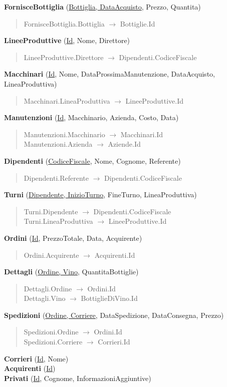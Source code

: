 \textbf{FornisceBottiglia} (\underline{Bottiglia, DataAcquisto}, Prezzo, Quantita)
\begin{verse}
	FornisceBottiglia.Bottiglia $\to$ Bottiglie.Id
\end{verse} 
\textbf{LineeProduttive} (\underline{Id}, Nome, Direttore)
\begin{verse}
	LineeProduttive.Direttore $\to$ Dipendenti.CodiceFiscale
\end{verse} 
\textbf{Macchinari} (\underline{Id}, Nome, DataProssimaManutenzione, DataAcquisto, LineaProduttiva)
\begin{verse}
	Macchinari.LineaProduttiva $\to$ LineeProduttive.Id
\end{verse} 
\textbf{Manutenzioni} (\underline{Id}, Macchinario, Azienda, Costo, Data)
\begin{verse}
	Manutenzioni.Macchinario $\to$ Macchinari.Id\\
	Manutenzioni.Azienda $\to$ Aziende.Id
\end{verse}
\textbf{Dipendenti} (\underline{CodiceFiscale}, Nome, Cognome, Referente)
\begin{verse}
	Dipendenti.Referente $\to$ Dipendenti.CodiceFiscale
\end{verse} 
\textbf{Turni} (\underline{Dipendente, InizioTurno}, FineTurno, LineaProduttiva)
\begin{verse}
	Turni.Dipendente $\to$ Dipendenti.CodiceFiscale\\
	Turni.LineaProduttiva $\to$ LineeProduttive.Id
\end{verse} 
\textbf{Ordini} (\underline{Id}, PrezzoTotale, Data, Acquirente)
\begin{verse}
	Ordini.Acquirente $\to$ Acquirenti.Id
\end{verse} 
\textbf{Dettagli} (\underline{Ordine, Vino}, QuantitaBottiglie)
\begin{verse}
	Dettagli.Ordine $\to$ Ordini.Id\\
	Dettagli.Vino $\to$ BottiglieDiVino.Id
\end{verse} 
\textbf{Spedizioni} (\underline{Ordine, Corriere}, DataSpedizione, DataConsegna, Prezzo)
\begin{verse}
	Spedizioni.Ordine $\to$ Ordini.Id\\
	Spedizioni.Corriere $\to$ Corrieri.Id
\end{verse} 
\textbf{Corrieri} (\underline{Id}, Nome)\\
\textbf{Acquirenti} (\underline{Id})\\
\textbf{Privati} (\underline{Id}, Cognome, InformazioniAggiuntive)
